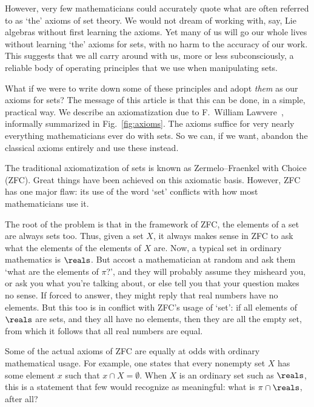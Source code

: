 \documentclass[12pt]{article}
\begin{document}
However, very few mathematicians could accurately quote what are often
referred to as `the' axioms of set theory.  We would not dream of working
with, say, Lie algebras without first learning the axioms.  Yet many of us
will go our whole lives without learning `the' axioms for sets, with no
harm to the accuracy of our work.  This suggests that we all carry around
with us, more or less subconsciously, a reliable body of operating
principles that we use when manipulating sets.  

What if we were to write down some of these principles and adopt
\emph{them} as our axioms for sets?  The message of this article is that
this can be done, in a simple, practical way.  We describe an axiomatization 
due to F.~William Lawvere~\cite{LawvETCS,LawvETCS2}, informally
summarized in Fig.~\ref{fig:axioms}.  The axioms suffice for very nearly
everything mathematicians ever do with sets.  So we can, if we want,
abandon the classical axioms entirely and use these instead.


The traditional axiomatization of sets is known as Zermelo--Fraenkel with
Choice (ZFC).  Great things have been achieved on this axiomatic basis.
However, ZFC has one major flaw: its use of the word `set' conflicts with
how most mathematicians use it.  

The root of the problem is that in the framework of ZFC, the elements of a
set are always sets too.  Thus, given a set $X$, it always makes sense in
ZFC to ask what the elements of the elements of $X$ are.  Now, a typical
set in ordinary mathematics is $\reals$.  But accost a mathematician at
random and ask them `what are the elements of $\pi$?', and they will
probably assume they misheard you, or ask you what you're talking about, or
else tell you that your question makes no sense.  If forced to answer, they
might reply that real numbers have no elements.  But this too is in
conflict with ZFC's usage of `set': if all elements of $\reals$ are sets,
and they all have no elements, then they are all the empty set, from which
it follows that all real numbers are equal.

Some of the actual axioms of ZFC are equally at odds with ordinary
mathematical usage.  For example, one states that every nonempty set $X$
has some element $x$ such that $x \cap X = \emptyset$.  When $X$ is an
ordinary set such as $\reals$, this is a statement that few would recognize
as meaningful: what is $\pi \cap \reals$, after all?
\end{document}
